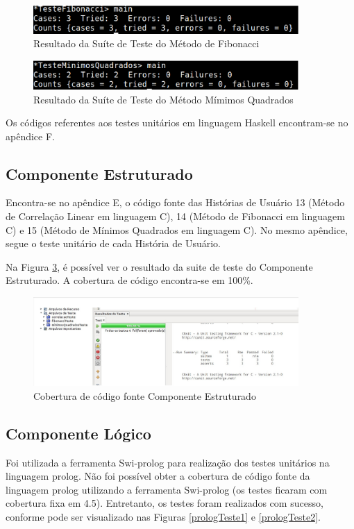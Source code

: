 \begin{figure}[H]
\centering
\includegraphics[width=0.9\textwidth]{figuras/testeFibonacciHaskell}
\caption{Resultado da Suíte de Teste do Método de Fibonacci}
\label{testeFibonacciHaskell}
\end{figure}

\begin{figure}[H]
\centering
\includegraphics[width=0.9\textwidth]{figuras/TesteMinimosHaskell}
\caption{Resultado da Suíte de Teste do Método Mímimos Quadrados}
\label{TesteMinimosHaskell}
\end{figure}

Os códigos referentes aos testes unitários em linguagem Haskell encontram-se no apêndice F.

\subsection{Componente Estruturado}
Encontra-se no apêndice E, o código fonte das Histórias de Usuário 13 (Método de Correlação Linear em linguagem C), 14 (Método de Fibonacci em linguagem C) e 15 (Método de Mínimos Quadrados em linguagem C). No mesmo apêndice, segue o teste
unitário de cada História de Usuário.

Na Figura \ref{testeC}, é possível ver o resultado da suite de teste do Componente Estruturado. A cobertura de código encontra-se em 100\%.

\begin{figure}[H]
\centering
\includegraphics[width=0.9\textwidth]{figuras/testeC}
\caption{Cobertura de código fonte Componente Estruturado}
\label{testeC}
\end{figure}

\subsection{Componente Lógico}
Foi utilizada a ferramenta Swi-prolog para realização dos testes unitários na linguagem prolog. Não foi possível obter a cobertura de código fonte da linguagem prolog utilizando a ferramenta Swi-prolog (os testes ficaram com cobertura fixa em 4.5). Entretanto, os testes foram realizados com sucesso, conforme pode ser visualizado nas Figuras \ref{prologTeste1} e \ref{prologTeste2}. 

